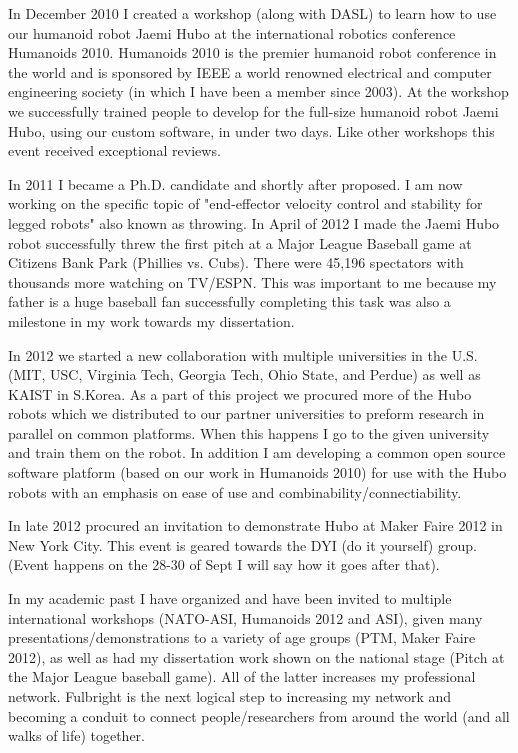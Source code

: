\documentclass[12pt]{article}
\begin{document}
In December 2010 I created a workshop (along with DASL) to learn how to use our humanoid robot Jaemi Hubo at the international robotics conference Humanoids 2010.  Humanoids 2010 is the premier humanoid robot conference in the world and is sponsored by IEEE a world renowned electrical and computer engineering society (in which I have been a member since 2003).  At the workshop we successfully trained people to develop for the full-size humanoid robot Jaemi Hubo, using our custom software, in under two days.  Like other workshops this event received exceptional reviews.

In 2011 I became a Ph.D. candidate and shortly after proposed.  I am now working on the specific topic of "end-effector velocity control and stability for legged robots" also known as throwing.  In April of 2012 I made the Jaemi Hubo robot successfully threw the first pitch at a Major League Baseball game at Citizens Bank Park (Phillies vs. Cubs).  There were 45,196 spectators with thousands more watching on TV/ESPN.  This was important to me because my father is a huge baseball fan successfully completing this task was also a milestone in my work towards my dissertation.  

In 2012 we started a new collaboration with multiple universities in the U.S. (MIT, USC, Virginia Tech, Georgia Tech, Ohio State, and Perdue) as well as KAIST in S.Korea.  As a part of this project we procured more of the Hubo robots which we distributed to our partner universities to preform research in parallel on common platforms.  When this happens I go to the given university and train them on the robot.  In addition I am developing a common open source software platform (based on our work in Humanoids 2010) for use with the Hubo robots with an emphasis on ease of use and combinability/connectiability.

In late 2012 procured an invitation to demonstrate Hubo at Maker Faire 2012 in New York City.  This event is geared towards the DYI (do it yourself) group. (Event happens on the 28-30 of Sept I will say how it goes after that). 

In my academic past I have organized and have been invited to multiple international workshops (NATO-ASI, Humanoids 2012 and ASI), given many presentations/demonstrations to a variety of age groups (PTM, Maker Faire 2012), as well as had my dissertation work shown on the national stage (Pitch at the Major League baseball game).  All of the latter increases my professional network.  Fulbright is the next logical step to increasing my network and becoming a conduit to connect people/researchers from around the world (and all walks of life) together.
\end{document}
